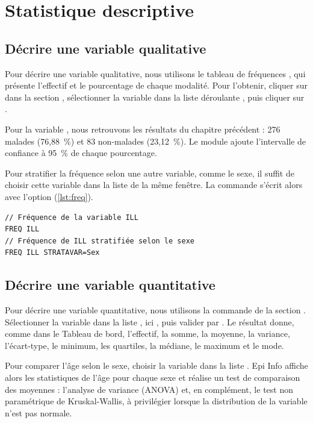 \section{Statistique descriptive}

\subsection{Décrire une variable qualitative}

Pour décrire une variable qualitative, nous utilisons le \og tableau de fréquences \fg{}, qui présente l'effectif et le pourcentage de chaque modalité. Pour l'obtenir, cliquer sur  dans la section , sélectionner la variable dans la liste déroulante , puis cliquer sur .

Pour la variable , nous retrouvons les résultats du chapitre précédent : 276 malades (76,88~\%) et 83 non-malades (23,12~\%). Le module  ajoute l'intervalle de confiance à 95~\% de chaque pourcentage.

Pour stratifier la fréquence selon une autre variable, comme le sexe, il suffit de choisir cette variable dans la liste  de la même fenêtre. La commande s'écrit alors avec l'option  (\autoref{lst:freq}).

\begin{tcolorbox}
	\begin{lstlisting}[language=EPIscript, style=mystyle, caption={Tableaux de fréquences}, label=lst:freq]
// Fréquence de la variable ILL
FREQ ILL
// Fréquence de ILL stratifiée selon le sexe
FREQ ILL STRATAVAR=Sex
	\end{lstlisting}
\end{tcolorbox}

\subsection{Décrire une variable quantitative}

Pour décrire une variable quantitative, nous utilisons la commande  de la section . Sélectionner la variable dans la liste , ici , puis valider par . Le résultat donne, comme dans le Tableau de bord, l'effectif, la somme, la moyenne, la variance, l'écart-type, le minimum, les quartiles, la médiane, le maximum et le mode.

Pour comparer l'âge selon le sexe, choisir la variable  dans la liste . Epi Info affiche alors les statistiques de l'âge pour chaque sexe et réalise un test de comparaison des moyennes : l'analyse de variance (ANOVA) et, en complément, le test non paramétrique de Kruskal-Wallis, à privilégier lorsque la distribution de la variable n'est pas normale.

